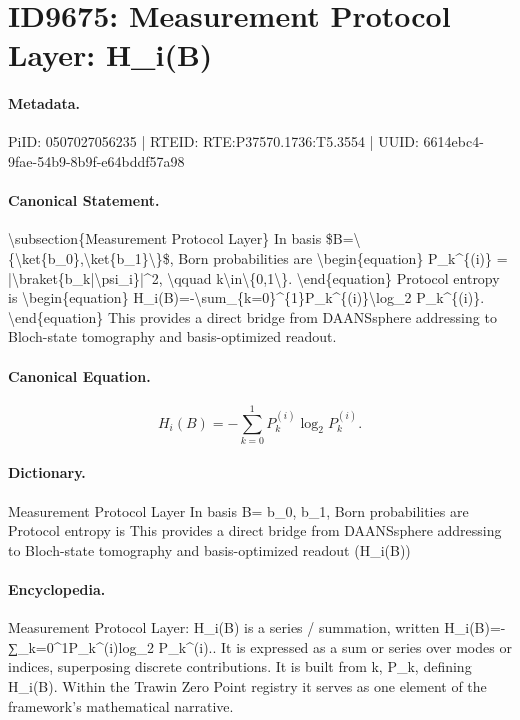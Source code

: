 \section*{ID9675: Measurement Protocol Layer: H\_i(B)}
\paragraph{Metadata.}
PiID: 0507027056235 | RTEID: RTE:P37570.1736:T5.3554 | UUID: 6614ebc4-9fae-54b9-8b9f-e64bddf57a98

\paragraph{Canonical Statement.}
\textbackslash{}subsection\{Measurement Protocol Layer\} In basis \$B=\textbackslash{}\{\textbackslash{}ket\{b\_0\},\textbackslash{}ket\{b\_1\}\textbackslash{}\}\$, Born probabilities are \textbackslash{}begin\{equation\} P\_k\textasciicircum{}\{(i)\} = |\textbackslash{}braket\{b\_k|\textbackslash{}psi\_i\}|\textasciicircum{}2, \textbackslash{}qquad k\textbackslash{}in\textbackslash{}\{0,1\textbackslash{}\}. \textbackslash{}end\{equation\} Protocol entropy is \textbackslash{}begin\{equation\} H\_i(B)=-\textbackslash{}sum\_\{k=0\}\textasciicircum{}\{1\}P\_k\textasciicircum{}\{(i)\}\textbackslash{}log\_2 P\_k\textasciicircum{}\{(i)\}. \textbackslash{}end\{equation\} This provides a direct bridge from DAANSsphere addressing to Bloch-state tomography and basis-optimized readout.

\paragraph{Canonical Equation.}
\[
H_i(B)=-\sum_{k=0}^{1}P_k^{(i)}\log_2 P_k^{(i)}.
\]

\paragraph{Dictionary.}
Measurement Protocol Layer In basis B= b\_0, b\_1, Born probabilities are Protocol entropy is This provides a direct bridge from DAANSsphere addressing to Bloch-state tomography and basis-optimized readout (H\_i(B))

\paragraph{Encyclopedia.}
Measurement Protocol Layer: H\_i(B) is a series / summation, written H\_i(B)=-∑\_k=0\textasciicircum{}1P\_k\textasciicircum{}(i)log\_2 P\_k\textasciicircum{}(i).. It is expressed as a sum or series over modes or indices, superposing discrete contributions. It is built from k, P\_k, defining H\_i(B). Within the Trawin Zero Point registry it serves as one element of the framework's mathematical narrative.
